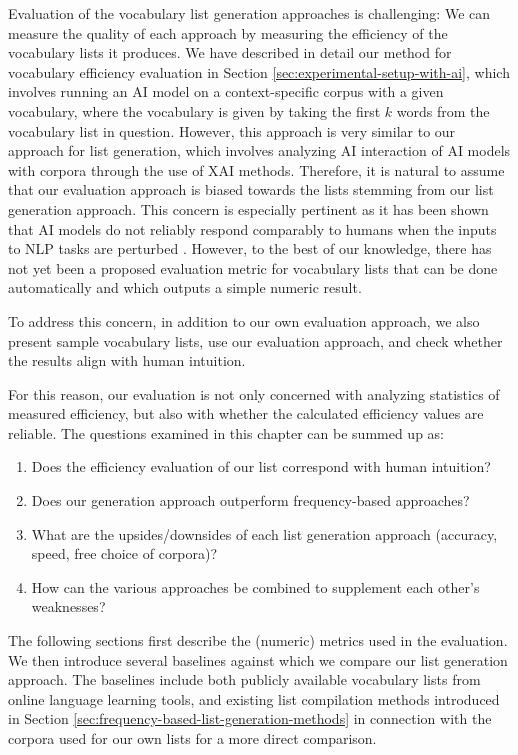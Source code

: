 Evaluation of the vocabulary list generation approaches is challenging:
We can measure the quality of each approach by measuring the efficiency of the vocabulary lists it produces.
We have described in detail our method for vocabulary efficiency evaluation in Section \ref{sec:experimental-setup-with-ai}, which involves running an AI model on a context-specific corpus with a given vocabulary, where the vocabulary is given by taking the first $k$ words from the vocabulary list in question.
However, this approach is very similar to our approach for list generation, which involves analyzing AI interaction of AI models with corpora through the use of XAI methods.
Therefore, it is natural to assume that our evaluation approach is biased towards the lists stemming from our list generation approach.
This concern is especially pertinent as it has been shown that AI models do not reliably respond comparably to humans when the inputs to NLP tasks are perturbed \cite{tjuatjaLLMsExhibitHumanlike2024}.
However, to the best of our knowledge, there has not yet been a proposed evaluation metric for vocabulary lists that can be done automatically and which outputs a simple numeric result.

To address this concern, in addition to our own evaluation approach, we also present sample vocabulary lists, use our evaluation approach, and check whether the results align with human intuition.

For this reason, our evaluation is not only concerned with analyzing statistics of measured efficiency, but also with whether the calculated efficiency values are reliable.
The questions examined in this chapter can be summed up as:
\begin{enumerate}
	\item Does the efficiency evaluation of our list correspond with human intuition?
	\item Does our generation approach outperform frequency-based approaches?
	\item What are the upsides/downsides of each list generation approach (accuracy, speed, free choice of corpora)?
	\item How can the various approaches be combined to supplement each other's weaknesses?
\end{enumerate}

The following sections first describe the (numeric) metrics used in the evaluation.
We then introduce several baselines against which we compare our list generation approach.
The baselines include both publicly available vocabulary lists from online language learning tools, and existing list compilation methods introduced in Section \ref{sec:frequency-based-list-generation-methods} in connection with the corpora used for our own lists for a more direct comparison.

